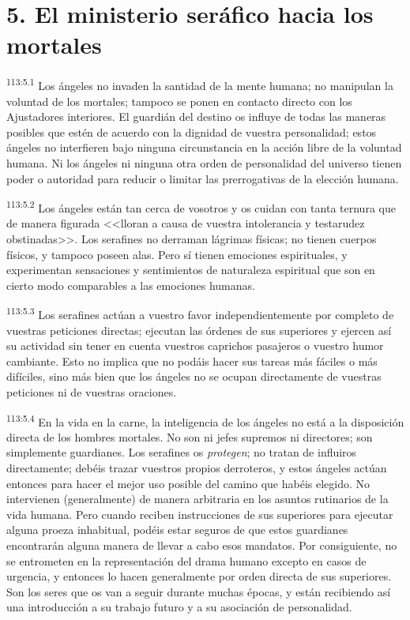 \documentclass[twoside, 11pt]{book}
\begin{document}
\section*{5. El ministerio seráfico hacia los mortales}
\par
\textsuperscript{113:5.1} Los ángeles no invaden la santidad de la mente humana; no manipulan la voluntad de los mortales; tampoco se ponen en contacto directo con los Ajustadores interiores. El guardián del destino os influye de todas las maneras posibles que estén de acuerdo con la dignidad de vuestra personalidad; estos ángeles no interfieren bajo ninguna circunstancia en la acción libre de la voluntad humana. Ni los ángeles ni ninguna otra orden de personalidad del universo tienen poder o autoridad para reducir o limitar las prerrogativas de la elección humana.

\par
\textsuperscript{113:5.2} Los ángeles están tan cerca de vosotros y os cuidan con tanta ternura que de manera figurada <<lloran a causa de vuestra intolerancia y testarudez obstinadas>>. Los serafines no derraman lágrimas físicas; no tienen cuerpos físicos, y tampoco poseen alas. Pero sí tienen emociones espirituales, y experimentan sensaciones y sentimientos de naturaleza espiritual que son en cierto modo comparables a las emociones humanas.

\par
\textsuperscript{113:5.3} Los serafines actúan a vuestro favor independientemente por completo de vuestras peticiones directas; ejecutan las órdenes de sus superiores y ejercen así su actividad sin tener en cuenta vuestros caprichos pasajeros o vuestro humor cambiante. Esto no implica que no podáis hacer sus tareas más fáciles o más difíciles, sino más bien que los ángeles no se ocupan directamente de vuestras peticiones ni de vuestras oraciones.

\par
\textsuperscript{113:5.4} En la vida en la carne, la inteligencia de los ángeles no está a la disposición directa de los hombres mortales. No son ni jefes supremos ni directores; son simplemente guardianes. Los serafines os \textit{protegen}; no tratan de influiros directamente; debéis trazar vuestros propios derroteros, y estos ángeles actúan entonces para hacer el mejor uso posible del camino que habéis elegido. No intervienen (generalmente) de manera arbitraria en los asuntos rutinarios de la vida humana. Pero cuando reciben instrucciones de sus superiores para ejecutar alguna proeza inhabitual, podéis estar seguros de que estos guardianes encontrarán alguna manera de llevar a cabo esos mandatos. Por consiguiente, no se entrometen en la representación del drama humano excepto en casos de urgencia, y entonces lo hacen generalmente por orden directa de sus superiores. Son los seres que os van a seguir durante muchas épocas, y están recibiendo así una introducción a su trabajo futuro y a su asociación de personalidad.
\end{document}
